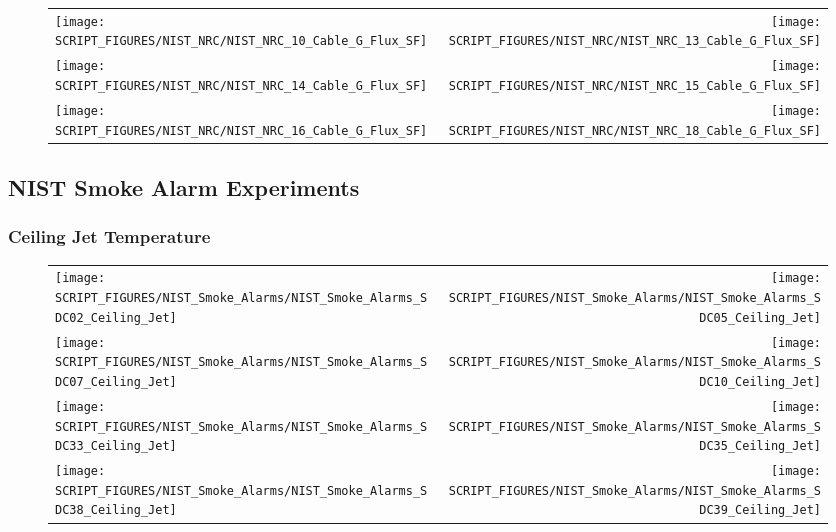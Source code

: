 \begin{figure}[p]
\begin{tabular*}{\textwidth}{l@{\extracolsep{\fill}}r}
\texttt{[image: SCRIPT\_FIGURES/NIST\_NRC/NIST\_NRC\_10\_Cable\_G\_Flux\_SF]} &
\texttt{[image: SCRIPT\_FIGURES/NIST\_NRC/NIST\_NRC\_13\_Cable\_G\_Flux\_SF]} \\
\texttt{[image: SCRIPT\_FIGURES/NIST\_NRC/NIST\_NRC\_14\_Cable\_G\_Flux\_SF]} &
\texttt{[image: SCRIPT\_FIGURES/NIST\_NRC/NIST\_NRC\_15\_Cable\_G\_Flux\_SF]} \\
\texttt{[image: SCRIPT\_FIGURES/NIST\_NRC/NIST\_NRC\_16\_Cable\_G\_Flux\_SF]} &
\texttt{[image: SCRIPT\_FIGURES/NIST\_NRC/NIST\_NRC\_18\_Cable\_G\_Flux\_SF]}
\end{tabular*}
\end{figure}

\clearpage

\subsection{NIST Smoke Alarm Experiments}

\subsubsection{Ceiling Jet Temperature}

\begin{figure}[p]
\begin{tabular*}{\textwidth}{l@{\extracolsep{\fill}}r}
\texttt{[image: SCRIPT\_FIGURES/NIST\_Smoke\_Alarms/NIST\_Smoke\_Alarms\_SDC02\_Ceiling\_Jet]} &
\texttt{[image: SCRIPT\_FIGURES/NIST\_Smoke\_Alarms/NIST\_Smoke\_Alarms\_SDC05\_Ceiling\_Jet]} \\
\texttt{[image: SCRIPT\_FIGURES/NIST\_Smoke\_Alarms/NIST\_Smoke\_Alarms\_SDC07\_Ceiling\_Jet]} &
\texttt{[image: SCRIPT\_FIGURES/NIST\_Smoke\_Alarms/NIST\_Smoke\_Alarms\_SDC10\_Ceiling\_Jet]} \\
\texttt{[image: SCRIPT\_FIGURES/NIST\_Smoke\_Alarms/NIST\_Smoke\_Alarms\_SDC33\_Ceiling\_Jet]} &
\texttt{[image: SCRIPT\_FIGURES/NIST\_Smoke\_Alarms/NIST\_Smoke\_Alarms\_SDC35\_Ceiling\_Jet]} \\
\texttt{[image: SCRIPT\_FIGURES/NIST\_Smoke\_Alarms/NIST\_Smoke\_Alarms\_SDC38\_Ceiling\_Jet]} &
\texttt{[image: SCRIPT\_FIGURES/NIST\_Smoke\_Alarms/NIST\_Smoke\_Alarms\_SDC39\_Ceiling\_Jet]}
\end{tabular*}
\end{figure}

